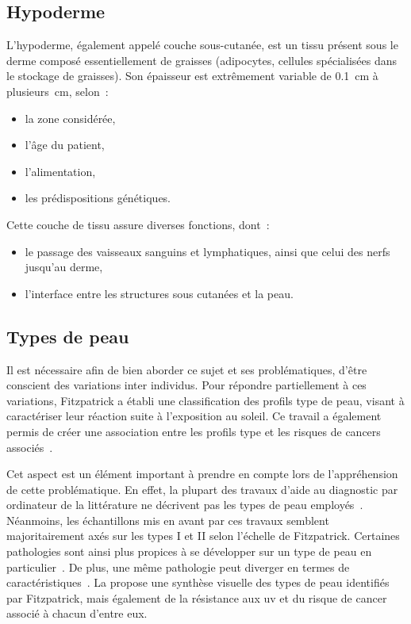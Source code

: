 \addtocounter{footnote}{1}
\clearpage

\subsection{Hypoderme}
L’hypoderme, également appelé couche sous-cutanée, est un tissu présent sous le derme composé essentiellement de graisses (adipocytes, cellules spécialisées dans le stockage de graisses). Son épaisseur est extrêmement variable de \SI{0,1}{\centi\metre} à \SI[parse-numbers = false]{plusieurs}{\centi\metre}, selon~:
\begin{itemize}
    \item la zone considérée,
    \item l’âge du patient,
    \item l’alimentation,
    \item les prédispositions génétiques.
\end{itemize}\par

Cette couche de tissu assure diverses fonctions, dont~:
\begin{itemize}
    \item le passage des vaisseaux sanguins et lymphatiques, ainsi que celui des nerfs jusqu’au derme,
    \item l’interface entre les structures sous cutanées et la peau.
\end{itemize}\par

\subsection{Types de peau}
Il est nécessaire afin de bien aborder ce sujet et ses problématiques, d’être conscient des variations inter individus. Pour répondre partiellement à ces variations, Fitzpatrick a établi une classification des profils type de peau, visant à caractériser leur réaction suite à l’exposition au soleil. Ce travail a également permis de créer une association entre les profils type et les risques de cancers associés~\cite{Fitzpatrick1988}.\par

Cet aspect est un élément important à prendre en compte lors de l'appréhension de cette problématique. En effet, la plupart des travaux d'aide au diagnostic par ordinateur de la littérature ne décrivent pas les types de peau employés~\cite{Celebi2007,Wiltgen2008,Koller2010}. Néanmoins, les échantillons mis en avant par ces travaux semblent majoritairement axés sur les types I et II selon l'échelle de Fitzpatrick. Certaines pathologies sont ainsi plus propices à se développer sur un type de peau en particulier~\cite{Narayanan2010}. De plus, une même pathologie peut diverger en termes de caractéristiques~\cite{Tuma2015}. La  propose une synthèse visuelle des types de peau identifiés par Fitzpatrick, mais également de la résistance aux \gls{uv} et du risque de cancer associé à chacun d'entre eux.\par

